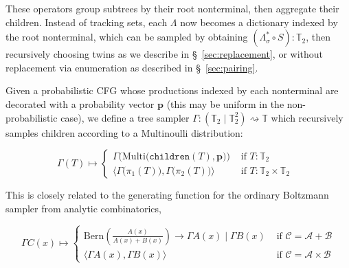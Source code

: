 \documentclass[sigplan,review,anonymous,acmsmall]{acmart}\settopmatter{printfolios=false,printccs=false,printacmref=false}
\begin{document}
These operators group subtrees by their root nonterminal, then aggregate their children. Instead of tracking sets, each $\Lambda$ now becomes a dictionary indexed by the root nonterminal, which can be sampled by obtaining $(\Lambda_\sigma^* \circ S): \mathbb{T}_2$, then recursively choosing twins as we describe in \S~\ref{sec:replacement}, or without replacement via enumeration as described in \S~\ref{sec:pairing}.


Given a probabilistic CFG whose productions indexed by each nonterminal are decorated with a probability vector $\mathbf{p}$ (this may be uniform in the non-probabilistic case), we define a tree sampler $\Gamma: (\mathbb{T}_2 \mid \mathbb{T}_2^2) \rightsquigarrow \mathbb{T}$ which recursively samples children according to a Multinoulli distribution:

\begin{equation*}
  \Gamma(T) \mapsto \begin{cases}
        \Gamma\big(\text{Multi} \big(\texttt{children}(T), \mathbf{p}\big)\big) & \text{ if $T: \mathbb{T}_2$ } \\
        \big\langle \Gamma\big(\pi_1(T)\big), \Gamma\big(\pi_2(T)\big) \big\rangle & \text{ if $T: \mathbb{T}_2\times\mathbb{T}_2$ }
  \end{cases}
\end{equation*}

This is closely related to the generating function for the ordinary Boltzmann sampler from analytic combinatorics,

\begin{equation*}
  \Gamma C(x) \mapsto \begin{cases}
  \text{Bern} \left(\frac{A(x)}{A(x) + B(x)}\right) \rightarrow \Gamma A(x) \mid \Gamma B(x) & \text{ if } \mathcal{C}=\mathcal{A}+\mathcal{B} \\
  \big\langle \Gamma A(x), \Gamma B(x)\big\rangle & \text{ if } \mathcal{C}=\mathcal{A} \times \mathcal{B}
  \end{cases}
\end{equation*}
\end{document}
